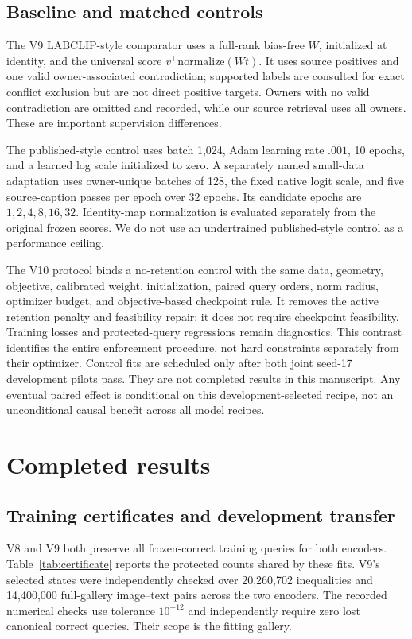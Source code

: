 \documentclass[11pt]{article}
\begin{document}
\subsection{Baseline and matched controls}
The V9 LABCLIP-style comparator uses a full-rank bias-free $W$, initialized
at identity, and the universal score $v^\top\mathrm{normalize}(Wt)$.
It uses source positives and one valid owner-associated contradiction;
supported labels are consulted for exact conflict exclusion but are not
direct positive targets. Owners with no valid contradiction are omitted
and recorded, while our source retrieval uses all owners. These are
important supervision differences.

The published-style control uses batch 1,024, Adam learning rate $.001$,
10 epochs, and a learned log scale initialized to zero. A separately named
small-data adaptation uses owner-unique batches of 128, the fixed native
logit scale, and five source-caption passes per epoch over 32 epochs.
Its candidate epochs are $1,2,4,8,16,32$. Identity-map normalization is
evaluated separately from the original frozen scores. We do not use an
undertrained published-style control as a performance ceiling.

The V10 protocol binds a no-retention control with the same data, geometry,
objective, calibrated weight, initialization, paired query orders, norm
radius, optimizer budget, and objective-based checkpoint rule. It removes
the active retention penalty and feasibility repair; it does not require
checkpoint feasibility. Training losses and protected-query regressions
remain diagnostics. This contrast identifies the entire enforcement
procedure, not hard constraints separately from their optimizer.
Control fits are scheduled only after both joint seed-17 development
pilots pass. They are not completed results in this manuscript.
Any eventual paired effect is conditional on this development-selected
recipe, not an unconditional causal benefit across all model recipes.

\section{Completed results}
\subsection{Training certificates and development transfer}
V8 and V9 both preserve all frozen-correct training queries for both
encoders. Table~\ref{tab:certificate} reports the protected counts shared
by these fits. V9's selected states were independently checked over
20,260,702 inequalities and 14,400,000 full-gallery image--text pairs across
the two encoders. The recorded numerical checks use tolerance $10^{-12}$
and independently require zero lost canonical correct queries. Their scope
is the fitting gallery.
\end{document}

